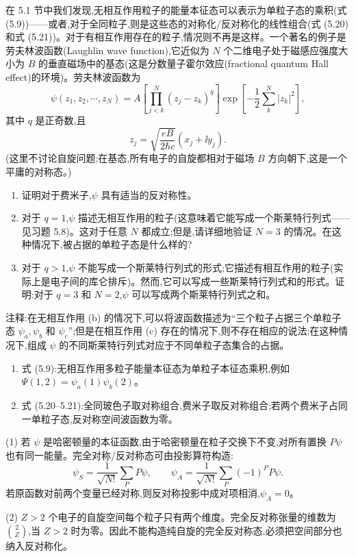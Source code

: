 \begin{question}
在 5.1 节中我们发现,无相互作用粒子的能量本征态可以表示为单粒子态的乘积(式 (5.9))——或者,对于全同粒子,则是这些态的对称化/反对称化的线性组合(式 (5.20) 和式 (5.21))。对于有相互作用存在的粒子,情况则不再是这样。一个著名的例子是劳夫林波函数(Laughlin wave function),它近似为 $N$ 个二维电子处于磁感应强度大小为 $B$ 的垂直磁场中的基态(这是分数量子霍尔效应(fractional quantum Hall effect)的环境)。劳夫林波函数为
\[
\psi(z_1,z_2,\cdots,z_N)=A\left[\prod_{j<k}^{N}(z_j-z_k)^q\right]\exp\left[-\frac12\sum_k^N |z_k|^2\right],
\]
其中 $q$ 是正奇数,且
\[
z_j=\sqrt{\frac{eB}{2\hbar c}}(x_j+\ii y_j).
\]
(这里不讨论自旋问题;在基态,所有电子的自旋都相对于磁场 $B$ 方向朝下,这是一个平庸的对称态。)
\begin{enumerate}
\item 证明对于费米子,$\psi$ 具有适当的反对称性。
\item 对于 $q=1$,$\psi$ 描述无相互作用的粒子(这意味着它能写成一个斯莱特行列式——见习题 5.8)。这对于任意 $N$ 都成立;但是,请详细地验证 $N=3$ 的情况。在这种情况下,被占据的单粒子态是什么样的?
\item 对于 $q>1$,$\psi$ 不能写成一个斯莱特行列式的形式;它描述有相互作用的粒子(实际上是电子间的库仑排斥)。然而,它可以写成一些斯莱特行列式和的形式。证明:对于 $q=3$ 和 $N=2$,$\psi$ 可以写成两个斯莱特行列式之和。
\end{enumerate}
注释:在无相互作用 (b) 的情况下,可以将波函数描述为“三个粒子占据三个单粒子态 $\psi_a,\psi_b$ 和 $\psi_c$”;但是在相互作用 (c) 存在的情况下,则不存在相应的说法;在这种情况下,组成 $\psi$ 的不同斯莱特行列式对应于不同单粒子态集合的占据。

\par\smallskip
{}
\begin{enumerate}[leftmargin=2.2em,itemsep=0.12em,topsep=0.12em,parsep=0pt]
\item 式 (5.9):无相互作用多粒子能量本征态为单粒子本征态乘积,例如 $\Psi(1,2)=\psi_a(1)\psi_b(2)$。
\item 式 (5.20--5.21):全同玻色子取对称组合,费米子取反对称组合;若两个费米子占同一单粒子态,反对称空间波函数为零。
\end{enumerate}

\begin{solution}

(1) 若 $\psi$ 是哈密顿量的本征函数,由于哈密顿量在粒子交换下不变,对所有置换 $P\psi$ 也有同一能量。完全对称/反对称态可由投影算符构造:
\[
\psi_S=\frac1{\sqrt{N!}}\sum_P P\psi,
\qquad
\psi_A=\frac1{\sqrt{N!}}\sum_P(-1)^P P\psi.
\]
若原函数对前两个变量已经对称,则反对称投影中成对项相消,$\psi_A=0$。

(2) $Z>2$ 个电子的自旋空间每个粒子只有两个维度。完全反对称张量的维数为 $\binom{2}{Z}$,当 $Z>2$ 时为零。因此不能构造纯自旋的完全反对称态,必须把空间部分也纳入反对称化。

\end{solution}
\end{question}

